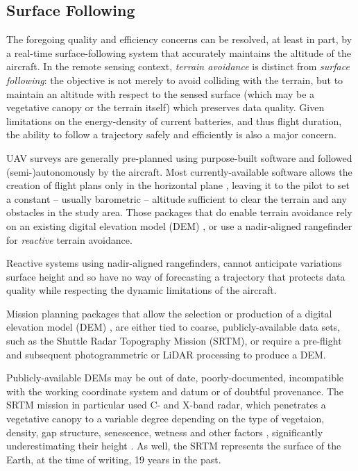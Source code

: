 \documentclass[doc]{apa6}
\begin{document}
\subsection{Surface Following}

The foregoing quality and efficiency concerns can be resolved, at least in part, by a real-time surface-following system that accurately maintains the altitude of the aircraft. In the remote sensing context, \emph{terrain avoidance} is distinct from \emph{surface following}: the objective is not merely to avoid colliding with the terrain, but to maintain an altitude with respect to the sensed surface (which may be a vegetative canopy or the terrain itself) which preserves data quality. Given limitations on the energy-density of current batteries, and thus flight duration, the ability to follow a trajectory safely and efficiently is also a major concern.

UAV surveys are generally pre-planned using purpose-built software and followed (semi-)autonomously by the aircraft. Most currently-available software allows the creation of flight plans only in the horizontal plane \parencite[e.g.,][]{ArduPilot2018,DJI2018a,Microdrones2018,Group2018,UAVToolbox2018}, leaving it to the pilot to set a constant -- usually barometric -- altitude sufficient to clear the terrain and any obstacles in the study area. Those packages that do enable terrain avoidance rely on an  existing digital elevation model (DEM) \parencite[e.g.,][]{PrecisionHawk2018,UgCS2018,MapsMadeEasy2018}, or use a nadir-aligned rangefinder for \emph{reactive} terrain avoidance.

Reactive systems using nadir-aligned rangefinders, cannot anticipate variations surface height and so have no way of forecasting a trajectory that protects data quality while respecting the dynamic limitations of the aircraft.

Mission planning packages that allow the selection or production of a digital elevation model (DEM) \parencite[e.g.,][]{PrecisionHawk2018,UgCS2018,MapsMadeEasy2018}, are either tied to coarse, publicly-available data sets, such as the Shuttle Radar Topography Mission (SRTM), or require a pre-flight and subsequent photogrammetric or LiDAR processing to produce a DEM.

Publicly-available DEMs may be out of date, poorly-documented, incompatible with the working coordinate system and datum or of doubtful provenance. The SRTM mission in particular used C- and X-band radar, which penetrates a vegetative canopy to a variable degree depending on the type of vegetaion, density, gap structure, senescence, wetness and other factors \parencite{Miliaresis2009}, significantly underestimating their height \parencite{Sexton2009}. As well, the SRTM represents the surface of the Earth, at the time of writing, 19 years in the past. 
\end{document}
